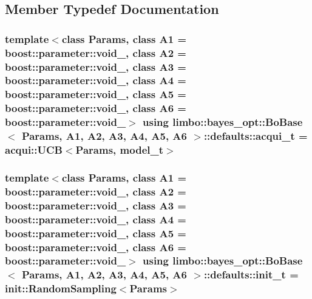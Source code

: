 \subsection{Member Typedef Documentation}
\hypertarget{structlimbo_1_1bayes__opt_1_1_bo_base_1_1defaults_a7728ece1763ffbcac4e37f219047dcb1}{}
\subsubsection[{acqui\+\_\+t}]{\setlength{\rightskip}{0pt plus 5cm}template$<$class Params, class A1 = boost\+::parameter\+::void\+\_\+, class A2 = boost\+::parameter\+::void\+\_\+, class A3 = boost\+::parameter\+::void\+\_\+, class A4 = boost\+::parameter\+::void\+\_\+, class A5 = boost\+::parameter\+::void\+\_\+, class A6 = boost\+::parameter\+::void\+\_\+$>$ using {\bf limbo\+::bayes\+\_\+opt\+::\+Bo\+Base}$<$ Params, A1, A2, A3, A4, A5, A6 $>$\+::{\bf defaults\+::acqui\+\_\+t} =  {\bf acqui\+::\+U\+C\+B}$<$Params, {\bf model\+\_\+t}$>$}\label{structlimbo_1_1bayes__opt_1_1_bo_base_1_1defaults_a7728ece1763ffbcac4e37f219047dcb1}
\hypertarget{structlimbo_1_1bayes__opt_1_1_bo_base_1_1defaults_afab889d523b8c28d1161079a5a453f79}{}
\subsubsection[{init\+\_\+t}]{\setlength{\rightskip}{0pt plus 5cm}template$<$class Params, class A1 = boost\+::parameter\+::void\+\_\+, class A2 = boost\+::parameter\+::void\+\_\+, class A3 = boost\+::parameter\+::void\+\_\+, class A4 = boost\+::parameter\+::void\+\_\+, class A5 = boost\+::parameter\+::void\+\_\+, class A6 = boost\+::parameter\+::void\+\_\+$>$ using {\bf limbo\+::bayes\+\_\+opt\+::\+Bo\+Base}$<$ Params, A1, A2, A3, A4, A5, A6 $>$\+::{\bf defaults\+::init\+\_\+t} =  {\bf init\+::\+Random\+Sampling}$<$Params$>$}\label{structlimbo_1_1bayes__opt_1_1_bo_base_1_1defaults_afab889d523b8c28d1161079a5a453f79}
\hypertarget{structlimbo_1_1bayes__opt_1_1_bo_base_1_1defaults_a74f559358b99209461a1aac1e0dacb1f}{}
